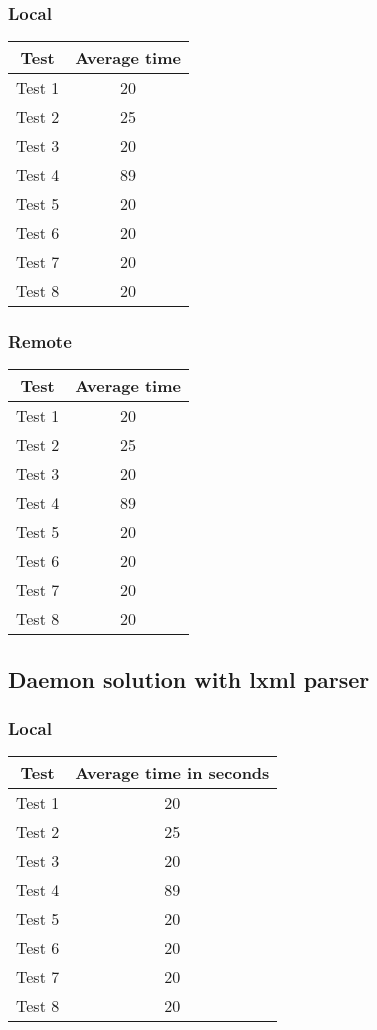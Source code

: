 \subsubsection{Local}
\begin{center}
    \begin{tabular}{| c | c |}
    \hline
    Test & Average time \\ \hline
    Test 1 & 20 \\ \hline
    Test 2 & 25 \\ \hline
    Test 3 & 20 \\ \hline
    Test 4 & 89 \\ \hline
    Test 5 & 20 \\ \hline
    Test 6 & 20 \\ \hline
    Test 7 & 20 \\ \hline
    Test 8 & 20 \\ \hline
    \end{tabular}
\end{center}
\subsubsection{Remote}
\begin{center}
    \begin{tabular}{| c | c |}
    \hline
    Test & Average time \\ \hline
    Test 1 & 20 \\ \hline
    Test 2 & 25 \\ \hline
    Test 3 & 20 \\ \hline
    Test 4 & 89 \\ \hline
    Test 5 & 20 \\ \hline
    Test 6 & 20 \\ \hline
    Test 7 & 20 \\ \hline
    Test 8 & 20 \\ \hline
    \end{tabular}
\end{center}

\subsection{Daemon solution with lxml parser}
\subsubsection{Local}
\begin{center}
    \begin{tabular}{| c | c |}
    \hline
    Test & Average time in seconds \\ \hline
    Test 1 & 20 \\ \hline
    Test 2 & 25 \\ \hline
    Test 3 & 20 \\ \hline
    Test 4 & 89 \\ \hline
    Test 5 & 20 \\ \hline
    Test 6 & 20 \\ \hline
    Test 7 & 20 \\ \hline
    Test 8 & 20 \\ \hline
    \end{tabular}
\end{center}

